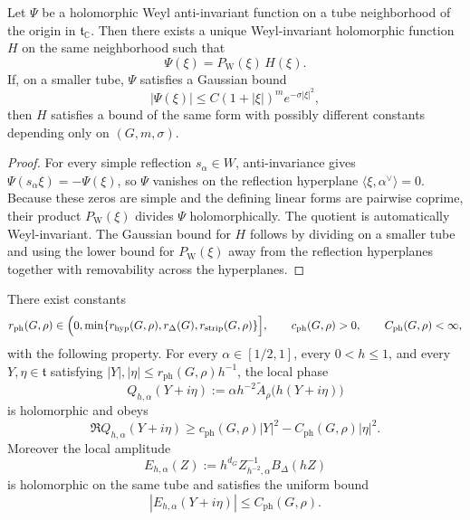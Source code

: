 \begin{lemma}\label{lem:A1_weyl_antiinvariant_divisibility}
Let $\Psi$ be a holomorphic Weyl anti-invariant function on a tube neighborhood of the origin in $\mathfrak t_\mathbb C$.
Then there exists a unique Weyl-invariant holomorphic function $H$ on the same neighborhood such that
\begin{equation}\label{eq:A1_antiinvariant_divisibility}
\Psi(\xi)=P_{\mathrm W}(\xi)\,H(\xi).
\end{equation}
If, on a smaller tube, $\Psi$ satisfies a Gaussian bound
\[
|\Psi(\xi)|\le C(1+|\xi|)^m e^{-\sigma|\xi|^2},
\]
then $H$ satisfies a bound of the same form with possibly different constants depending only on $(G,m,\sigma)$.
\end{lemma}

\begin{proof}
For every simple reflection $s_\alpha\in W$, anti-invariance gives
$\Psi(s_\alpha\xi)=-\Psi(\xi)$, so $\Psi$ vanishes on the reflection hyperplane $\langle \xi,\alpha^\vee\rangle=0$.
Because these zeros are simple and the defining linear forms are pairwise coprime, their product $P_{\mathrm W}(\xi)$ divides $\Psi$ holomorphically.
The quotient is automatically Weyl-invariant.
The Gaussian bound for $H$ follows by dividing on a smaller tube and using the lower bound for $P_{\mathrm W}(\xi)$ away from the reflection hyperplanes together with removability across the hyperplanes.
\end{proof}

\begin{lemma}\label{lem:A1_low_regime_complex_phase}
There exist constants
\[
r_{\mathrm{ph}}(G,\rho)\in\Bigl(0,\min\{r_{\mathrm{hyp}}(G,\rho),r_\Delta(G),r_{\mathrm{strip}}(G,\rho)\}\Bigr],
\qquad
c_{\mathrm{ph}}(G,\rho)>0,
\qquad
C_{\mathrm{ph}}(G,\rho)<\infty,
\]
with the following property.
For every $\alpha\in[1/2,1]$, every $0<h\le 1$, and every $Y,\eta\in\mathfrak t$ satisfying
$|Y|,|\eta|\le r_{\mathrm{ph}}(G,\rho)h^{-1}$, the local phase
\begin{equation}\label{eq:A1_local_complex_phase_def}
Q_{h,\alpha}(Y+i\eta)
:=
\alpha h^{-2}\widetilde A_\rho\bigl(h(Y+i\eta)\bigr)
\end{equation}
is holomorphic and obeys
\begin{equation}\label{eq:A1_local_complex_phase_bound}
\Re Q_{h,\alpha}(Y+i\eta)
\ge
c_{\mathrm{ph}}(G,\rho)|Y|^2-C_{\mathrm{ph}}(G,\rho)|\eta|^2.
\end{equation}
Moreover the local amplitude
\begin{equation}\label{eq:A1_local_amplitude_def}
E_{h,\alpha}(Z)
:=
h^{d_G}Z_{h^{-2},\alpha}^{-1}B_\Delta(hZ)
\end{equation}
is holomorphic on the same tube and satisfies the uniform bound
\begin{equation}\label{eq:A1_local_amplitude_bound}
|E_{h,\alpha}(Y+i\eta)|\le C_{\mathrm{ph}}(G,\rho).
\end{equation}
\end{lemma}

